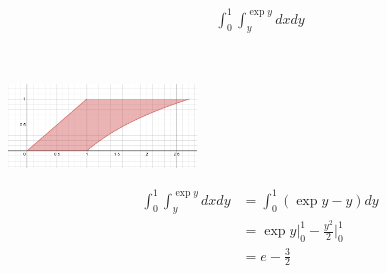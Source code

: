 \begin{align*}
    \int_{0}^{1} \int_{y}^{\exp{y}} dx dy
\end{align*}

\begin{solution} \
    \begin{center}
        \includegraphics[width=0.375\textwidth]{img/e2p2.png}
    \end{center}
    
    \begin{align*}
        \int_{0}^{1} \int_{y}^{\exp{y}} dx dy &= \int_{0}^{1} (\exp{y} - y) dy\\
        &= \exp{y}\bigg|_{0}^{1} - \frac{y^2}{2}\bigg|_{0}^{1} \\
        &= e - \frac{3}{2}
    \end{align*}
\end{solution}